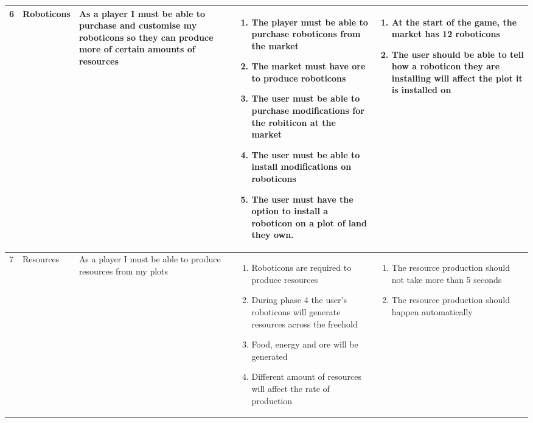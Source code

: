 \begin{landscape}
\begin{longtable}{|l||l|p{4cm}|p{8cm}|p{7cm}|}
	6 & Roboticons
	& As a player I must be able to purchase and customise my roboticons so they can produce more of certain amounts of resources
	& \begin{enumerate}[label=6.1.\arabic*.]
		\item The player must be able to purchase roboticons from the market
		\item The market must have ore to produce roboticons
		\item The user must be able to purchase modifications for the robiticon at the market
		\item The user must be able to install modifications on roboticons 
		\item The user must have the option to install a roboticon on a plot of land they own.
	\end{enumerate}
	& \begin{enumerate}[label=6.2.\arabic*.]
		\item At the start of the game, the market has 12 roboticons
		\item The user should be able to tell how a roboticon they are installing will affect the plot it is installed on
	\end{enumerate} \\ \hline

	7 & Resources
	& As a player I must be able to produce resources from my plots
	& \begin{enumerate}[label=7.1.\arabic*.]
		\item Roboticons are required to produce resources
		\item During phase 4 the user’s roboticons will generate resources across the freehold
		\item Food, energy and ore will be generated
		\item Different amount of resources will affect the rate of production
	\end{enumerate}
	& \begin{enumerate}[label=7.2.\arabic*.]
		\item The resource production should not take more than 5 seconds
		\item The resource production should happen automatically
	\end{enumerate} \\ \hline


\end{longtable}
\end{landscape}
